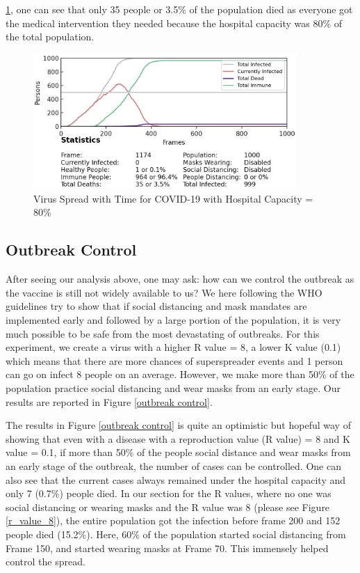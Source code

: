 \documentclass[11pt]{article}
\begin{document}
\ref{hospital_capacity_80percent}, one can see that only 35 people or 3.5\% of the population died as everyone got the medical intervention they needed because the hospital capacity was 80\% of the total population.

\begin{figure}[H]
    \centering
    \includegraphics[width=10cm]{figures/hospital_capacity_80percent.png}
    \caption{Virus Spread with Time for COVID-19 with Hospital Capacity = 80\%}
    \label{hospital_capacity_80percent}
\end{figure}

\subsection{Outbreak Control} 
After seeing our analysis above, one may ask: how can we control the outbreak as the vaccine is still not widely available to us? We here following the WHO guidelines\cite{who_guidelines} try to show that if social distancing and mask mandates are implemented early and followed by a large portion of the population, it is very much possible to be safe from the most devastating of outbreaks. For this experiment, we create a virus with a higher R value = 8, a lower K value (0.1) which means that there are more chances of superspreader events and 1 person can go on infect 8 people on an average. However, we make more than 50\% of the population practice social distancing and wear masks from an early stage. Our results are reported in Figure \ref{outbreak control}. 

The results in Figure \ref{outbreak control} is quite an optimistic but hopeful way of showing that even with a disease with a reproduction value (R value) = 8 and K value = 0.1, if more than 50\% of the people social distance and wear masks from an early stage of the outbreak, the number of cases can be controlled. One can also see that the current cases always remained under the hospital capacity and only 7 (0.7\%) people died. In our section for the R values, where no one was social distancing or wearing masks and the R value was 8 (please see Figure \ref{r_value_8}), the entire population got the infection before frame 200 and 152 people died (15.2\%). Here, 60\% of the population started social distancing from Frame 150, and started wearing masks at Frame 70. This immensely helped control the spread.
\end{document}
